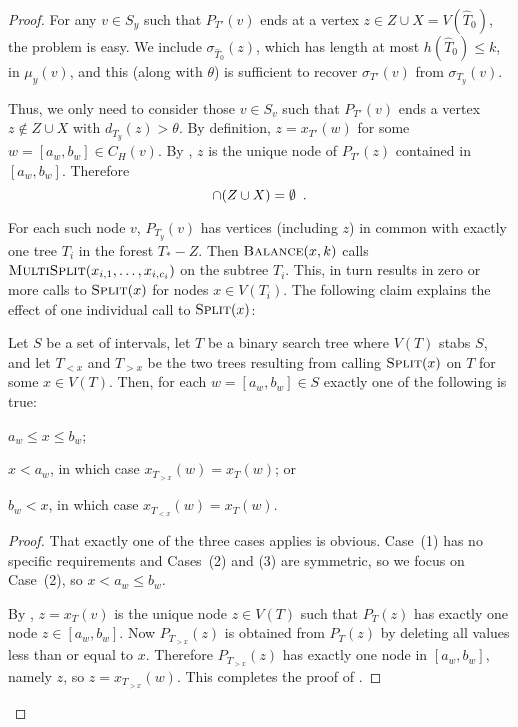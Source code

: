 \documentclass[kpfonts]{patmorin}
\let\le\leqslant
\begin{document}
\begin{proof}
  For any $v\in S_y$ such that $P_{T'}(v)$ ends at a vertex $z\in Z\cup X=V(\hat{T}_0)$, the problem is easy.  We include $\sigma_{\hat{T}_0}(z)$, which has length at most $h(\hat{T}_0)\le k$, in $\mu_y(v)$, and this (along with $\theta$) is sufficient to recover $\sigma_{T'}(v)$ from $\sigma_{T_y}(v)$.

  Thus, we only need to consider those $v\in S_v$ such that $P_{T'}(v)$ ends a vertex $z\not\in Z\cup X$ with $d_{T_y}(z)>\theta$.    By definition,  $z=x_{T'}(w)$ for some $w=[a_w,b_w]\in C_H(v)$.  By , $z$ is the unique node of $P_{T'}(z)$ contained in $[a_w,b_w]$.  Therefore
  \begin{equation}
    [a_w,b_w]\cap (Z\cup X)=\emptyset \enspace . \eqlabel{empty}
  \end{equation}

  For each such node $v$, $P_{T_y}(v)$ has vertices (including $z$) in common with exactly one tree $T_{i}$ in the forest $T_*-Z$.  Then $\textsc{Balance}(x,k)$ calls $\textsc{MultiSplit}(x_{i,1},\ldots,x_{i,c_i})$ on the subtree $T_{i}$.  This, in turn results in zero or more calls to $\textsc{Split}(x)$ for nodes $x\in V(T_{i})$. The following claim explains the effect of one individual call to $\textsc{Split}(x)$:

  \begin{clm}
    Let $S$ be a set of intervals, let $T$ be a binary search tree where $V(T)$ stabs $S$, and let $T_{<x}$ and $T_{>x}$ be the two trees resulting from calling $\textsc{Split}(x)$ on $T$ for some $x\in V(T)$.  Then, for each $w=[a_w,b_w]\in S$ exactly one of the following is true:
    \begin{compactenum}
      \item $a_w\le x\le b_w$;
      \item $x< a_w$, in which case $x_{T_{>x}}(w)=x_T(w)$; or
      \item $b_w < x$, in which case $x_{T_{<x}}(w)=x_T(w)$.
    \end{compactenum}
  \end{clm}

  \begin{proof}
    That exactly one of the three cases applies is obvious.  Case~(1) has no specific requirements and Cases~(2) and (3) are symmetric, so we focus on Case~(2), so $x < a_w\le b_w$.

    By , $z=x_T(v)$ is the unique node $z\in V(T)$ such that $P_T(z)$ has exactly one node $z\in [a_w,b_w]$.  Now $P_{T_{>x}}(z)$ is obtained from $P_T(z)$ by deleting all values less than or equal to $x$. Therefore $P_{T_{>x}}(z)$ has exactly one node in $[a_w,b_w]$, namely $z$, so $z=x_{T_{>x}}(w)$.  This completes the proof of .
  \end{proof}


\end{proof}
\end{document}
